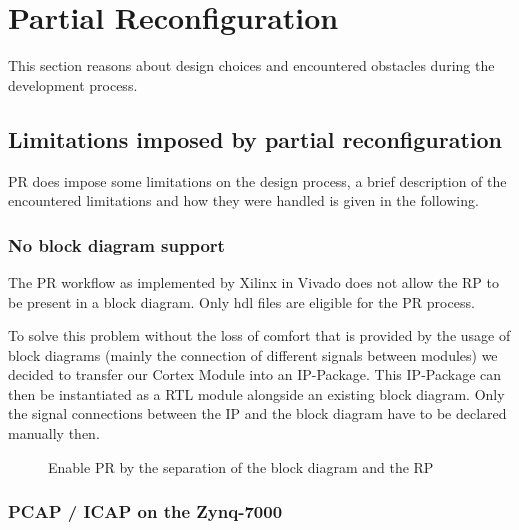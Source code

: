 \section{Partial Reconfiguration}
This section reasons about design choices and encountered obstacles during the development process.

\subsection{Limitations imposed by partial reconfiguration}
\gls{PR} does impose some limitations on the design process, a brief description of the encountered limitations and how they were handled is given in the following.

\subsubsection{No block diagram support}
The \gls{PR} workflow as implemented by Xilinx in Vivado does not allow the \gls{RP} to be present in a block diagram.
Only hdl files are eligible for the \gls{PR} process.

To solve this problem without the loss of comfort that is provided by the usage of block diagrams (mainly the connection of different signals between modules) we decided to transfer our Cortex Module into an \gls{IP}-Package.
This \gls{IP}-Package can then be instantiated as a \gls{RTL} module alongside an existing block diagram.
Only the signal connections between the \gls{IP} and the block diagram have to be declared manually then.

\begin{figure}[ht]
\caption{Enable \gls{PR} by the separation of the block diagram and the \gls{RP}}\label{fig:blockDiagramGlue}
\end{figure}
\subsubsection{\gls{PCAP} / \gls{ICAP} on the Zynq-7000}

